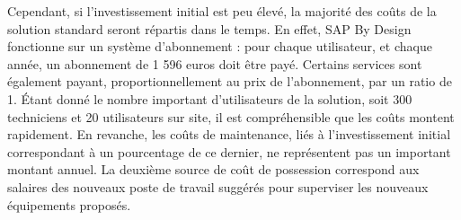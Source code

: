 Cependant, si l’investissement initial est peu élevé, la majorité des coûts de la solution standard seront répartis dans le temps. En effet, SAP By Design fonctionne sur un système d’abonnement : pour chaque utilisateur, et chaque année, un abonnement de 1 596 euros doit être payé. Certains services sont également payant, proportionnellement au prix de l’abonnement, par un ratio de 1. Étant donné le nombre important d’utilisateurs de la solution, soit 300 techniciens et 20 utilisateurs sur site, il est compréhensible que les coûts montent rapidement. En revanche, les coûts de maintenance, liés à l’investissement initial correspondant à un pourcentage de ce dernier, ne représentent pas un important montant annuel. La deuxième source de coût de possession correspond aux salaires des nouveaux poste de travail suggérés pour superviser les nouveaux équipements proposés.


\begin{figure}[H]
    \noindent{}
\end{figure}

\begin{figure}[H]
    \noindent{}
\end{figure}


